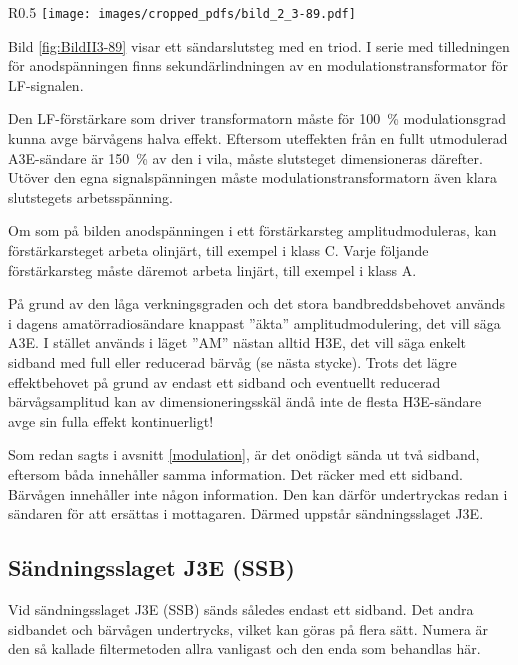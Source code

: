 \begin{wrapfigure}{R}{0.5\textwidth}
\texttt{[image: images/cropped\_pdfs/bild\_2\_3-89.pdf]}
\caption{A3E-modulator}
\label{fig:BildII3-89}
\end{wrapfigure}

Bild \ref{fig:BildII3-89} visar ett sändarslutsteg med en triod.
I serie med tilledningen för anodspänningen finns sekundärlindningen av en
modulationstransformator för LF-signalen.

Den LF-förstärkare som driver transformatorn måste för 100~\% modulationsgrad
kunna avge bärvågens halva effekt.
Eftersom uteffekten från en fullt utmodulerad A3E-sändare är 150~\% av den i
vila, måste slutsteget dimensioneras därefter.
Utöver den egna signalspänningen måste modulationstransformatorn även klara
slutstegets arbetsspänning.

Om som på bilden anodspänningen i ett förstärkarsteg amplitudmoduleras,
kan förstärkarsteget arbeta olinjärt, till exempel i klass C.
Varje följande förstärkarsteg måste däremot arbeta linjärt, till exempel i klass A.

På grund av den låga verkningsgraden och det stora bandbreddsbehovet 
används i dagens amatörradiosändare knappast ''äkta'' amplitudmodulering,
det vill säga A3E.
I stället används i läget ''AM'' nästan alltid H3E, det vill säga enkelt
sidband med full eller reducerad bärvåg (se nästa stycke).
Trots det lägre effektbehovet på grund av endast ett sidband och eventuellt
reducerad bärvågsamplitud kan av dimensioneringsskäl ändå inte de flesta
H3E-sändare avge sin fulla effekt kontinuerligt!

Som redan sagts i avsnitt \ref{modulation}, är det onödigt sända ut två sidband,
eftersom båda innehåller samma information.
Det räcker med ett sidband.
Bärvågen innehåller inte någon information.
Den kan därför undertryckas redan i sändaren för att ersättas i mottagaren.
Därmed uppstår sändningsslaget J3E.

\subsection{Sändningsslaget J3E (SSB)}

Vid sändningsslaget J3E (SSB) sänds således endast ett sidband.
Det andra sidbandet och bärvågen undertrycks, vilket kan göras på flera sätt.
Numera är den så kallade filtermetoden allra vanligast och den enda som
behandlas här.


